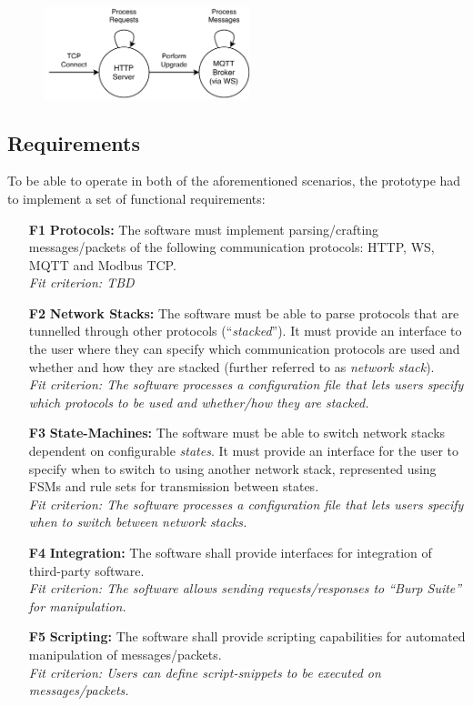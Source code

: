 \begin{figure}[ht]
    \centering
    \includegraphics[width=6cm]{img/ch04/Statemachine 2.pdf}
    \label{fig:aws-statemachine}
\end{figure}


\subsection{Requirements}
To be able to operate in both of the aforementioned scenarios, the prototype had to implement a set of functional requirements:
\begin{itemize}
    \item [\textbf{F1}] \textbf{Protocols:} The software must implement parsing/crafting messages/packets of the following communication protocols: \ac{HTTP}, \ac{WS}, \ac{MQTT} and Modbus \ac{TCP}. \\
          \textit{Fit criterion: TBD} %
    \item [\textbf{F2}] \textbf{Network Stacks:} The software must be able to parse protocols that are tunnelled through other protocols (\enquote{\emph{stacked}}). It must provide an interface to the user where they can specify which communication protocols are used and whether and how they are stacked (further referred to as \emph{network stack}).\\
          \textit{Fit criterion: The software processes a configuration file that lets users specify which protocols to be used and whether/how they are stacked.}
    \item [\textbf{F3}] \textbf{State-Machines:} The software must be able to switch network stacks dependent on configurable \emph{states}. It must provide an interface for the user to specify when to switch to using another network stack, represented using \acp{FSM} and rule sets for transmission between states.\\
          \textit{Fit criterion: The software processes a configuration file that lets users specify when to switch between network stacks.}
    \item [\textbf{F4}] \textbf{Integration:} The software shall provide interfaces for integration of third-party software.\\
          \textit{Fit criterion: The software allows sending requests/responses to \enquote{Burp Suite} for manipulation.}
    \item [\textbf{F5}] \textbf{Scripting:} The software shall provide scripting capabilities for automated manipulation of messages/packets.\\
          \textit{Fit criterion: Users can define script-snippets to be executed on messages/packets.}
\end{itemize}


